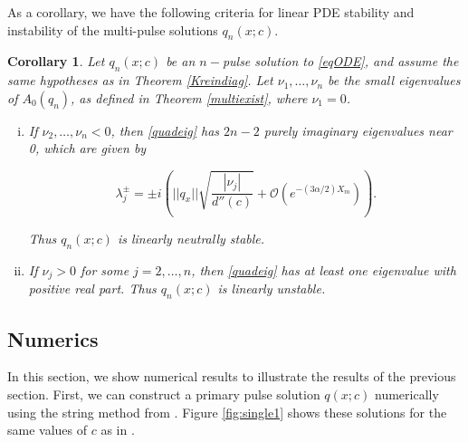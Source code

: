 \documentclass[12pt]{article}
\newtheorem{corollary}{Corollary}
\begin{document}
As a corollary, we have the following criteria for linear PDE stability and instability of the multi-pulse solutions $q_n(x; c)$.

\begin{corollary}\label{stabcrit}
Let $q_n(x; c)$ be an $n-$pulse solution to \eqref{eqODE}, and assume the same hypotheses as in Theorem \ref{Kreindiag}. Let $\nu_1, \dots, \nu_n$ be the small eigenvalues of $A_0(q_n)$, as defined in Theorem \ref{multiexist}, where $\nu_1 = 0$.
\begin{enumerate}[(i)]
	\item If $\nu_2, \dots, \nu_n < 0$, then \eqref{quadeig} has $2n - 2$ purely imaginary eigenvalues near 0, which are given by

	\begin{equation}\label{npulseKreineigs}
	\lambda_j^\pm = \pm i \left( ||q_x|| \sqrt{ \frac{|\nu_j|}{d''(c)} } + \mathcal{O}(e^{-(3 \alpha/2) X_m}) \right).
	\end{equation}

	Thus $q_n(x; c)$ is linearly neutrally stable.

	\item If $\nu_j > 0$ for some $j = 2, \dots, n$, then \eqref{quadeig} has at least one eigenvalue with positive real part. Thus $q_n(x; c)$ is linearly unstable.
\end{enumerate}

\end{corollary}

\subsection{Numerics}

In this section, we show numerical results to illustrate the results of the previous section. First, we can construct a primary pulse solution $q(x; c)$ numerically using the string method from \cite{Chamard2011}. Figure \ref{fig:single1} shows these solutions for the same values of $c$ as in \cite[Figure 3]{Chen1997}.
\end{document}
